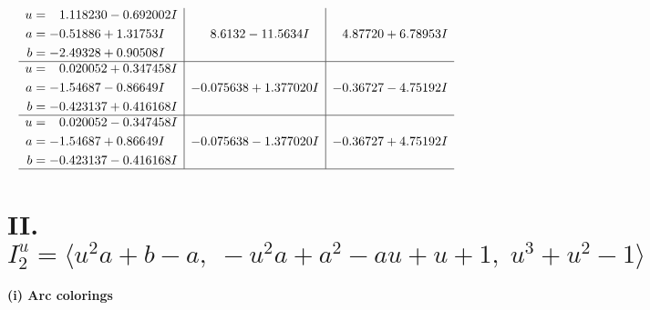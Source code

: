 \documentclass[1p]{elsarticle_modified}
\theoremstyle{definition}
\begin{document}
$$\begin{array}{c|c|c}
\begin{aligned}
u &= \phantom{-}1.118230 - 0.692002 I \\
a &= -0.51886 + 1.31753 I \\
b &= -2.49328 + 0.90508 I\end{aligned}
 & \phantom{-}8.6132 - 11.5634 I & \phantom{-}4.87720 + 6.78953 I \\ \hline\begin{aligned}
u &= \phantom{-}0.020052 + 0.347458 I \\
a &= -1.54687 - 0.86649 I \\
b &= -0.423137 + 0.416168 I\end{aligned}
 & -0.075638 + 1.377020 I & -0.36727 - 4.75192 I \\ \hline\begin{aligned}
u &= \phantom{-}0.020052 - 0.347458 I \\
a &= -1.54687 + 0.86649 I \\
b &= -0.423137 - 0.416168 I\end{aligned}
 & -0.075638 - 1.377020 I & -0.36727 + 4.75192 I\\
 \hline 
 \end{array}$$\newpage\newpage\renewcommand{\arraystretch}{1}
\centering \section*{II. $I^u_{2}= \langle u^2 a+b- a,\;- u^2 a+a^2- a u+u+1,\;u^3+u^2-1 \rangle$}
\flushleft \textbf{(i) Arc colorings}\\
\end{document}
